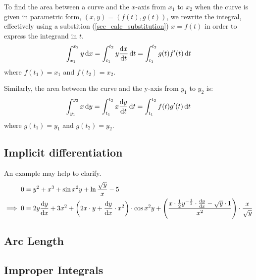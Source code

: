 \documentclass[fleqn,a4paper,11pt]{article}
\begin{document}
    To find the area between a curve and the \(x\)-axis from \(x_1\) to \(x_2\)
    when the curve is given in parametric form, \((x, y) = (f(t), g(t))\),
    we rewrite the integral, effectively using a substition
    (\ref{sec_calc_substitution}) \(x = f(t)\) in order to express the integrand
    in \(t\).
    \begin{equation}
    \int_{x_1}^{x_2} y \dd{x} =
     \int_{t_1}^{t_2} y \dv{x}{t} \dd{t} =
     \int_{t_1}^{t_2} g(t)f'(t) \dd{t}
    \end{equation}
    where \(f(t_1) = x_1\) and \(f(t_2) = x_2\).

    Similarly, the area between the curve and the y-axis from \(y_1\) to \(y_2\)
    is:
    \begin{equation}
    \int_{y_1}^{y_2} x \dd{y} =
     \int_{t_1}^{t_2} x \dv{y}{t} \dd{t} =
     \int_{t_1}^{t_2} f(t)g'(t) \dd{t}
    \end{equation}
    where \(g(t_1) = y_1\) and \(g(t_2) = y_2\).

    \subsection{Implicit differentiation}



    An example may help to clarify.
    \begin{align*}
    0 &= y^2 + x^3 + \sin x^2 y + \ln \frac{\sqrt y} x - 5 \\
    \implies 0 &=
                2y \dv{y}{x} + 3x^2 +
                \pqty{2x \cdot y + \dv{y}{x} \cdot x^2} \cdot \cos x^2 y +
                \pqty{\frac{x \cdot \frac 12 y^{-\frac 12} \cdot \dv{y}{x} -
                            \sqrt y \cdot 1}
                           {x^2}} \cdot \frac{x}{\sqrt y} \\
    \end{align*}


    \subsection{Arc Length}

    \subsection{Improper Integrals}

\end{document}

